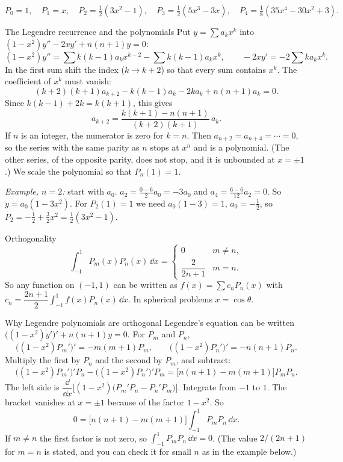 \[ P_0 = 1,\quad P_1 = x,\quad P_2 = \tfrac12(3x^2-1),\quad P_3 = \tfrac12(5x^3 - 3x),\quad P_4 = \tfrac18(35x^4 - 30x^2 + 3). \]

\begin{derivbox}{The Legendre recurrence and the polynomials}
Put $y = \sum a_kx^k$ into $(1-x^2)y'' - 2xy' + n(n+1)y = 0$:
\[ (1-x^2)y'' = \sum k(k-1)a_kx^{k-2} - \sum k(k-1)a_kx^{k},\qquad -2xy' = -2\sum ka_kx^k. \]
In the first sum shift the index ($k\to k+2$) so that every sum contains $x^k$. The coefficient of $x^k$ must vanish:
\[ (k+2)(k+1)a_{k+2} - k(k-1)a_k - 2ka_k + n(n+1)a_k = 0. \]
Since $k(k-1) + 2k = k(k+1)$, this gives
\[ a_{k+2} = \frac{k(k+1) - n(n+1)}{(k+2)(k+1)}\,a_k. \]
If $n$ is an integer, the numerator is zero for $k = n$. Then $a_{n+2} = a_{n+4} = \cdots = 0$, so the series with the same parity as $n$ stops at $x^n$ and is a polynomial. (The other series, of the opposite parity, does not stop, and it is unbounded at $x=\pm1$.) We scale the polynomial so that $P_n(1) = 1$.

\emph{Example, $n=2$:} start with $a_0$. $a_2 = \frac{0 - 6}{2}a_0 = -3a_0$ and $a_4 = \frac{6-6}{12}a_2 = 0$. So $y = a_0(1 - 3x^2)$. For $P_2(1) = 1$ we need $a_0(1-3) = 1$, $a_0 = -\frac12$, so $P_2 = -\frac12 + \frac32x^2 = \frac12(3x^2-1)$.
\end{derivbox}

\begin{defbox}{Orthogonality}
\[ \int_{-1}^{1}P_m(x)P_n(x)\,\dd x = \begin{cases}0 & m\ne n,\\[2pt] \dfrac{2}{2n+1} & m=n.\end{cases} \]
So any function on $(-1,1)$ can be written as $f(x) = \sum c_nP_n(x)$ with $c_n = \dfrac{2n+1}{2}\displaystyle\int_{-1}^1f(x)P_n(x)\,\dd x$. In spherical problems $x = \cos\theta$.
\end{defbox}

\begin{derivbox}{Why Legendre polynomials are orthogonal}
Legendre's equation can be written $\big((1-x^2)y'\big)' + n(n+1)y = 0$. For $P_m$ and $P_n$,
\[ \big((1-x^2)P_m'\big)' = -m(m+1)P_m,\qquad \big((1-x^2)P_n'\big)' = -n(n+1)P_n. \]
Multiply the first by $P_n$ and the second by $P_m$, and subtract:
\[ \big((1-x^2)P_m'\big)'P_n - \big((1-x^2)P_n'\big)'P_m = \big[n(n+1) - m(m+1)\big]P_mP_n. \]
The left side is $\dfrac{\dd}{\dd x}\Big[(1-x^2)\big(P_m'P_n - P_n'P_m\big)\Big]$. Integrate from $-1$ to $1$. The bracket vanishes at $x = \pm1$ because of the factor $1-x^2$. So
\[ 0 = \big[n(n+1) - m(m+1)\big]\int_{-1}^1P_mP_n\,\dd x. \]
If $m\ne n$ the first factor is not zero, so $\int_{-1}^1P_mP_n\,\dd x = 0$. (The value $2/(2n+1)$ for $m=n$ is stated, and you can check it for small $n$ as in the example below.)
\end{derivbox}

